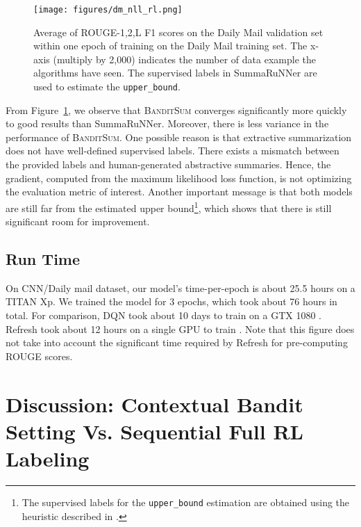 \documentclass[11pt,a4paper]{article}
\newcommand{\B}{\textsc{BanditSum }}
\newcommand{\Bnospace}{\textsc{BanditSum}}
\begin{document}
\begin{figure}[!h]
  \texttt{[image: figures/dm\_nll\_rl.png]}
  \caption[Caption for LOF]{Average of ROUGE-1,2,L F1 scores on the Daily Mail validation set within one epoch of training on the Daily Mail training set. The x-axis (multiply by 2,000) indicates the number of data example the algorithms have seen. The supervised labels in SummaRuNNer are used to estimate the \texttt{upper\_bound}.}
  \label{fig:train_efficiency}
\end{figure}

From Figure~\ref{fig:train_efficiency}, we observe that \B converges significantly more quickly to good results than SummaRuNNer. Moreover, there is less variance in the performance of \Bnospace. One possible reason is that extractive summarization does not have well-defined supervised labels. There exists a mismatch between the provided labels and human-generated abstractive summaries. Hence, the gradient, computed from the maximum likelihood loss function, is not optimizing the evaluation metric of interest. Another important message is that both models are still far from the estimated upper bound\footnote{The supervised labels for the \texttt{upper\_bound} estimation are obtained using the heuristic described in \citet{ext5_summarunner}.}, which shows that there is still significant room for improvement.






\subsection{Run Time}
On CNN/Daily mail dataset, our model's time-per-epoch is about 25.5 hours on a TITAN Xp. We trained the model for 3 epochs, which took about 76 hours in total. For comparison, DQN took about 10 days to train on a GTX 1080 \citep{yao2018deep}. Refresh took about 12 hours on a single GPU to train \citep{DBLP:Narayan/2018}. Note that this figure does not take into account the significant time required by Refresh for pre-computing ROUGE scores.





\section{Discussion: Contextual Bandit Setting Vs. Sequential Full RL Labeling \label{sec:discussion}}
\end{document}

